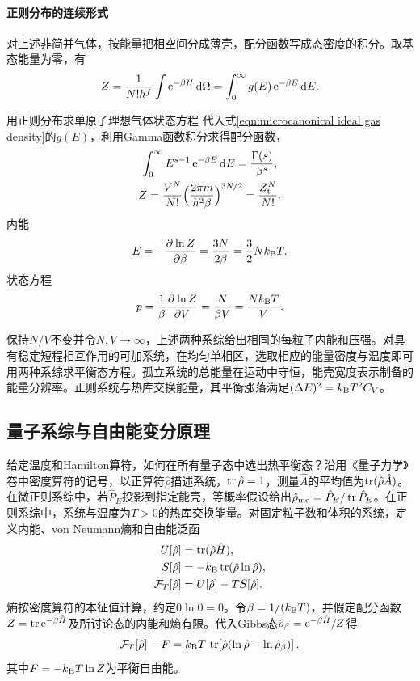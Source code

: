 \paragraph{正则分布的连续形式}
对上述非简并气体，按能量把相空间分成薄壳，配分函数写成态密度的积分。取基态能量为零，有
\begin{align}
	Z = \frac1{N!h^f}\int\mathop{}\!\mathrm{e}^{-\beta H}\mathop{}\!\mathrm{d}\Omega = \int_0^\infty g(E)\mathop{}\!\mathrm{e}^{-\beta E}\mathop{}\!\mathrm{d} E.
\end{align}
\begin{example}{用正则分布求单原子理想气体状态方程}{}
	代入式\eqref{eqn:microcanonical ideal gas density}的$g(E)$，利用Gamma函数积分求得配分函数，
	\begin{gather*}
		\int_0^\infty E^{s-1}\mathop{}\!\mathrm{e}^{-\beta E}\mathop{}\!\mathrm{d} E = \frac{\Gamma(s)}{\beta^s},\\
		Z = \frac{V^N}{N!}\Bigl(\frac{2\pi m}{h^2\beta}\Bigr)^{3N/2} = \frac{Z_\mathrm t^N}{N!}.
	\end{gather*}
	内能
	\begin{align}
		E = -\frac{\partial^{}\ln Z}{\partial{\beta}^{}} = \frac{3N}{2\beta} = \frac32Nk_{\mathrm{B}} T.
	\end{align}
	状态方程
	\begin{align}
		p = \frac1\beta\frac{\partial^{}\ln Z}{\partial{V}^{}} = \frac N{\beta V} = \frac{Nk_{\mathrm{B}} T}V.
	\end{align}
\end{example}
保持$N/V$不变并令$N,V \to \infty$，上述两种系综给出相同的每粒子内能和压强。对具有稳定短程相互作用的可加系统，在均匀单相区，选取相应的能量密度与温度即可用两种系综求平衡态方程。孤立系统的总能量在运动中守恒，能壳宽度表示制备的能量分辨率。正则系统与热库交换能量，其平衡涨落满足$(\Delta E)^2 = k_{\mathrm{B}} T^2C_V$。

\subsection{量子系综与自由能变分原理}
\label{sec:gibbs-variational}

给定温度和Hamilton算符，如何在所有量子态中选出热平衡态？沿用《量子力学》卷中密度算符的记号，以正算符$\hat\rho$描述系统，$\operatorname{tr}\hat\rho = 1$，测量$\hat A$的平均值为$\operatorname{tr}(\hat\rho\hat A)$。在微正则系综中，若$\hat P_E$投影到指定能壳，等概率假设给出$\hat\rho_{\mathrm{mc}} = \hat P_E/\operatorname{tr}\hat P_E$。在正则系综中，系统与温度为$T > 0$的热库交换能量。对固定粒子数和体积的系统，定义内能、von Neumann熵和自由能泛函
\begin{subequations}
	\label{eq:sm-density-operator-functionals}
	\begin{align}
		U[\hat\rho] &= \operatorname{tr}(\hat\rho\hat H),\\
		S[\hat\rho] &= -k_{\mathrm{B}}\operatorname{tr}(\hat\rho\ln\hat\rho),\\
		\mathcal F_T[\hat\rho] &= U[\hat\rho] - T S[\hat\rho].
	\end{align}
\end{subequations}
熵按密度算符的本征值计算，约定$0\ln0 = 0$。令$\beta = 1/(k_{\mathrm{B}} T)$，并假定配分函数$Z = \operatorname{tr}\mathop{}\!\mathrm{e}^{-\beta\hat H}$及所讨论态的内能和熵有限。代入Gibbs态$\hat\rho_\beta = \mathop{}\!\mathrm{e}^{-\beta\hat H}/Z$得
\begin{equation}
	\mathcal F_T[\hat\rho] - F
	= k_{\mathrm{B}} T\,\operatorname{tr}\!\left[\hat\rho(\ln\hat\rho - \ln\hat\rho_\beta)\right].
	\label{eq:gibbs-var}
\end{equation}
其中$F = -k_{\mathrm{B}} T\ln Z$为平衡自由能。

